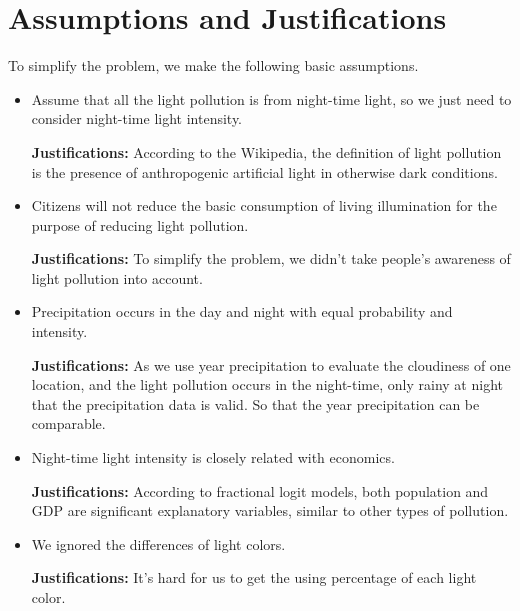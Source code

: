 \MinParskip{}
\section{Assumptions and Justifications} 
To simplify the problem, we make the following basic assumptions.

\begin{itemize}
    \item Assume that all the light pollution is from night-time light, so we just need to consider night-time light intensity.  

    \textbf{Justifications: }According to the Wikipedia\cite{wiki}, the definition of light pollution is the presence of anthropogenic artificial light in otherwise dark conditions. 

    \item Citizens will not reduce the basic consumption of living illumination for the purpose of reducing light pollution.
    
    \textbf{Justifications: }To simplify the problem, we didn't take people's awareness of light pollution into account.

    \item Precipitation occurs in the day and night with equal probability and intensity.
    
    \textbf{Justifications: }As we use year precipitation to evaluate the cloudiness of one location, and the light pollution occurs in the night-time, only rainy at night that the precipitation data is valid. So that the year precipitation can be comparable.

    \item Night-time light intensity is closely related with economics.
    
    \textbf{Justifications: }According to fractional logit models\cite{GALLAWAY2010658}, both population and GDP are significant explanatory variables, similar to other types of pollution. 

    \item We ignored the differences of light colors.
    
    \textbf{Justifications: }It's hard for us to get the using percentage of each light color.
\end{itemize}

